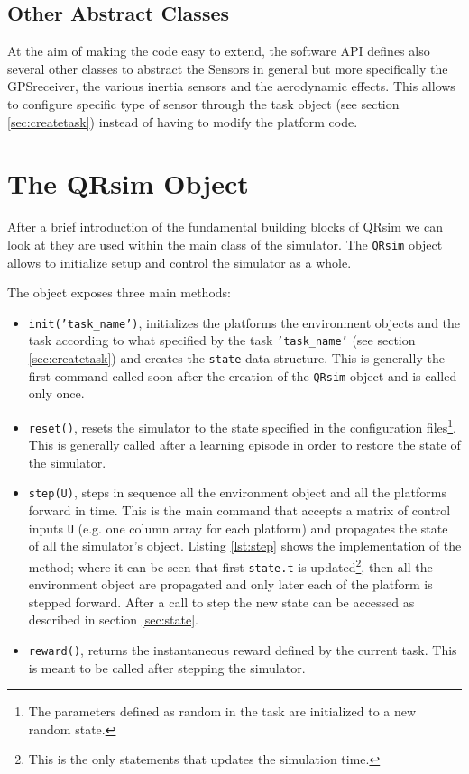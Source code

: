 \documentclass[a4paper,11pt]{report}
\newcommand{\sname}{QRsim\xspace}
\begin{document}
\subsection{Other Abstract Classes}

At the aim of making the code easy to extend, the software API defines also several other classes to abstract the Sensors in general but more specifically the GPSreceiver, the various inertia sensors and the aerodynamic effects. This allows to configure specific type of sensor through the task object (see section \ref{sec:createtask}) instead of having to modify the platform code.

\section{The \sname Object}\label{sec:qrobj}

After a brief introduction of the fundamental building blocks of \sname we can look at they are used within the main class of the simulator. The \texttt{\sname} object allows to initialize setup and control the simulator as a whole. 

The object exposes three main methods:
\begin{itemize}
 \item \texttt{init('task\_name')}, initializes the platforms the environment objects and the task according to what specified by the task \texttt{'task\_name'} (see section \ref{sec:createtask}) and creates the \texttt{state} data structure. This is generally the first command called soon after the creation of the \texttt{\sname} object and is called only once.
 \item \texttt{reset()}, resets the simulator to the state specified in the configuration files\footnote{The parameters defined as random in the task are initialized to a new random state.}. This is generally called after a learning episode in order to restore the state of the simulator. 
 \item \texttt{step(U)}, steps in sequence all the environment object and all the platforms forward in time. This is the main command that accepts a matrix of control inputs \texttt{U} (e.g. one column array for each platform) and propagates the state of all the simulator's object. Listing \ref{lst:step} shows the implementation of the method; where it can be seen that first \texttt{state.t} is updated\footnote{This is the only statements that updates the simulation time.}, then all the environment object are propagated and only later each of the platform is stepped forward.
 After a call to step the new state can be accessed as described in section \ref{sec:state}.
 \item \texttt{reward()}, returns the instantaneous reward defined by the current task. This is meant to be called after stepping the simulator.
\end{itemize}
\end{document}
